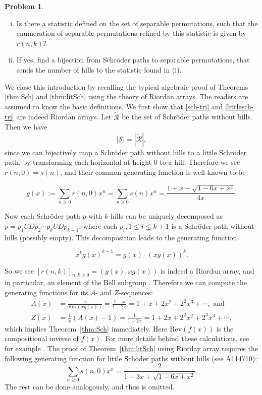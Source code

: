 \documentclass[11pt,reqno]{amsart}
\numberwithin{equation}{section}
\theoremstyle{plain}
\theoremstyle{definition}
\newtheorem{?}[theorem]{Problem}
\newcommand{\R}{\mathcal{R}}
\newcommand{\s}{\mathcal{S}}
\newcommand{\Rev}{\mathrm{Rev}}
\begin{document}
\begin{?}\label{find stat}
\begin{enumerate}[(i)]
\item Is there a statistic defined on the set of separable permutations, such that the enumeration of separable permutations refined by this statistic is given by $r(n,k)$?
\item If yes, find a bijection from Schr\"oder paths to separable permutations, that sends the number of hills to the statistic found in (i).
\end{enumerate}
\end{?}

We close this introduction by recalling the typical algebraic proof of Theorems \ref{thm:Sch} and \ref{thm:litSch} using the theory of Riordan arrays. The readers are assumed to know the basic definitions. We first show that \eqref{sch-tri} and \eqref{littlesch-tri} are indeed Riordan arrays. Let $\widetilde{\R}$ be the set of Schr\"oder paths without hills. Then we have
$$|\s|=|\widetilde{\R}|,$$
since we can bijectively map a Schr\"oder path without hills to a little Schr\"oder path, by transforming each horizontal at height $0$ to a hill. Therefore we see $r(n,0)=s(n)$, and their common generating function is well-known to be

$$g(x):=\sum_{n\ge 0}r(n,0)x^n=\sum_{n\ge 0}s(n)x^n=\frac{1+x-\sqrt{1-6x+x^2}}{4x}.$$

Now each Schr\"oder path $p$ with $k$ hills can be uniquely decomposed as $p=p_1UDp_2\cdots p_kUDp_{k+1}$, where each $p_i,1\le i\le k+1$ is a Schr\"oder path without hills (possibly empty). This decomposition leads to the generating function

$$x^kg(x)^{k+1}=g(x)\cdot(xg(x))^k.$$

So we see $[r(n,k)]_{n,k\ge 0}=(g(x),xg(x))$ is indeed a Riordan array, and in particular, an element of the Bell subgroup \cite[\S 2.3]{Sha}. Therefore we can compute the generating functions for its $A$- and $Z$-sequences:
\begin{align*}
A(x)&=\frac{x}{\Rev(xg(x))}=\frac{1-x}{1-2x}=1+x+2x^2+2^2x^3+\cdots, \text{ and}\\
Z(x)&=\frac{1}{x}(A(x)-1)=\frac{1}{1-2x}=1+2x+2^2x^2+2^3x^3+\cdots,
\end{align*}
which implies Theorem~\ref{thm:Sch} immediately. Here $\Rev(f(x))$ is the compositional inverse of $f(x)$. For more details behind these calculations, see for example \cite[\S 7.5]{Bar}. The proof of Theorem~\ref{thm:litSch} using Riorday array requires the following generating function for little Sch\"oder paths without hills (see \href{http://oeis.org/A114710}{A114710}):
$$\sum_{n\ge 0}s(n,0)x^n=\frac{2}{1+3x+\sqrt{1-6x+x^2}}.$$
The rest can be done analogously, and thus is omitted.
\end{document}

